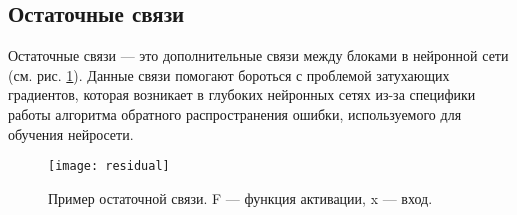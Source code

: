 \subsection{Остаточные связи}
Остаточные связи \cite{residual} --- это дополнительные связи между блоками
в нейронной сети (см. рис. \ref{fig:residual}). Данные связи помогают бороться с проблемой
затухающих градиентов, которая возникает в глубоких нейронных сетях из-за
специфики работы алгоритма обратного распространения ошибки, используемого для
обучения нейросети.

\begin{figure}[!htb]
    \centering
    \caption{Пример остаточной связи. F --- функция активации, x --- вход.}
    \texttt{[image: residual]}
    \label{fig:residual}
\end{figure}
